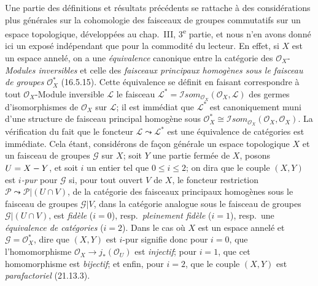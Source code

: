 \begin{remark}[21.13.13]
\label{IV.21.13.13}
Une partie des définitions et résultats précédents se rattache à des considérations
plus générales sur la cohomologie des faisceaux de groupes commutatifs sur un espace
topologique, développées au chap.~III, 3\textsuperscript{e} partie, et nous n'en avons
donné ici un exposé indépendant que pour la commodité du lecteur. En effet, si $X$
est un espace annelé, on a une \emph{équivalence} canonique entre la catégorie des
$\mathcal O_X$-\emph{Modules inversibles} et celle des \emph{faisceaux principaux homogènes
sous le faisceau de groupes} $\mathcal O_X^*$ (16.5.15). Cette équivalence se définit
en faisant correspondre à tout $\mathcal O_X$-Module inversible $\mathscr L$ le
faisceau $\mathscr L^*=\mathscr Isom_{\mathcal O_X}(\mathcal O_X,\mathscr L)$ des
germes d'isomorphismes de $\mathcal O_X$ sur $\mathscr L$; il est immédiat que
$\mathscr L^*$ est canoniquement muni d'une structure de faisceau principal homogène
sous $\mathcal O_X^*\cong\mathscr Isom_{\mathcal O_X}(\mathcal O_X,\mathcal O_X)$.
La vérification du fait que le foncteur $\mathscr L\leadsto\mathscr L^*$ est une
équivalence de catégories est immédiate.
Cela étant, considérons de façon générale un espace topologique $X$ et un faisceau de
groupes $\mathscr G$ sur $X$; soit $Y$ une partie fermée de $X$, posons $U=X- Y$, et
soit $i$ un entier tel que $0\leq i\leq2$; on dira que le couple $(X,Y)$ est
\emph{$i$-pur} pour $\mathscr G$ si, pour tout ouvert $V$ de $X$, le foncteur
restriction $\mathscr P\leadsto\mathscr P|(U\cap V)$, de la catégorie des faisceaux
principaux homogènes sous le faisceau de groupes $\mathscr G|V$, dans la catégorie
analogue sous le faisceau de groupes $\mathscr G|(U\cap V)$, est \emph{fidèle}
($i=0$), resp.\ \emph{pleinement fidèle} ($i=1$), resp.\ une \emph{équivalence de
catégories} ($i=2$). Dans le cas où $X$ est un espace annelé et
$\mathscr G=\mathcal O_X^*$, dire que $(X,Y)$ est $i$-pur signifie donc pour $i=0$,
que l'homomorphisme $\mathcal O_X\to j_*(\mathcal O_U)$ est \emph{injectif}; pour
$i=1$, que cet homomorphisme est \emph{bijectif}; et enfin, pour $i=2$, que le couple
$(X,Y)$ est \emph{parafactoriel} (21.13.3).


\end{remark}

